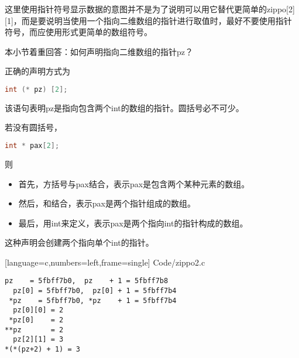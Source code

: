\begin{frame}[fragile]\ft{\secname}

这里使用指针符号显示数据的意图并不是为了说明可以用它替代更简单的{\tf zippo[2][1]}，而是要说明当使用一个指向二维数组的指针进行取值时，\textcolor{acolor1}{最好不要使用指针符号，而应使用形式更简单的数组符号。}
\end{frame}

\begin{frame}[fragile]
本小节着重回答：如何声明指向二维数组的指针{\tf pz}？
\end{frame}

\begin{frame}[fragile]
正确的声明方式为
\begin{lstlisting}[language=c,backgroundcolor=\color{red!20}]
int (* pz) [2]; 
\end{lstlisting}
该语句表明{\tf pz}是指向包含两个{\tf int}的数组的指针。\textcolor{acolor1}{圆括号必不可少。}

\end{frame}

\begin{frame}[fragile]
若没有圆括号，
\begin{lstlisting}[language=c,backgroundcolor=\color{red!20}]
int * pax[2]; 
\end{lstlisting}
则
\begin{itemize}
\item
首先，方括号与{\tf pax}结合，表示{\tf pax}是包含两个某种元素的数组。
\item
然后，和{\tf *}结合，表示{\tf pax}是两个指针组成的数组。
\item
最后，用{\tf int}来定义，表示{\tf pax}是两个指向{\tf int}的指针构成的数组。
\end{itemize}
这种声明会创建两个指向单个{\tf int}的指针。
\end{frame}

\begin{frame}

[language=c,numbers=left,frame=single]
{Code/zippo2.c}
\end{frame}


\begin{frame}[fragile]
\begin{lstlisting}[backgroundcolor=\color{red!20}]
  pz    = 5fbff7b0,  pz    + 1 = 5fbff7b8
  pz[0] = 5fbff7b0,  pz[0] + 1 = 5fbff7b4
 *pz    = 5fbff7b0, *pz    + 1 = 5fbff7b4
  pz[0][0] = 2
 *pz[0]    = 2
**pz       = 2
  pz[2][1] = 3
*(*(pz+2) + 1) = 3
\end{lstlisting}
\end{frame}

